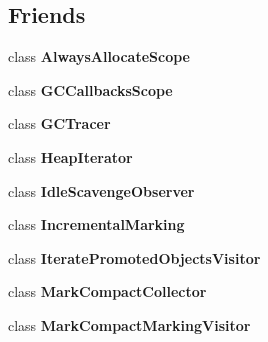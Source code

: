 \subsection*{Friends}
\begin{DoxyCompactItemize}
\item 
class {\bfseries Always\+Allocate\+Scope}\hypertarget{classv8_1_1internal_1_1_heap_ac91b5d86c9421c14c5d1ac542e048fa7}{}\label{classv8_1_1internal_1_1_heap_ac91b5d86c9421c14c5d1ac542e048fa7}

\item 
class {\bfseries G\+C\+Callbacks\+Scope}\hypertarget{classv8_1_1internal_1_1_heap_aa5dafc4b49819817c1ab40d34e4038a2}{}\label{classv8_1_1internal_1_1_heap_aa5dafc4b49819817c1ab40d34e4038a2}

\item 
class {\bfseries G\+C\+Tracer}\hypertarget{classv8_1_1internal_1_1_heap_af0a250e40f134d7b35c7c22304f35304}{}\label{classv8_1_1internal_1_1_heap_af0a250e40f134d7b35c7c22304f35304}

\item 
class {\bfseries Heap\+Iterator}\hypertarget{classv8_1_1internal_1_1_heap_a17740079af4633df7d13bb9d3732f54d}{}\label{classv8_1_1internal_1_1_heap_a17740079af4633df7d13bb9d3732f54d}

\item 
class {\bfseries Idle\+Scavenge\+Observer}\hypertarget{classv8_1_1internal_1_1_heap_aa626bcfe03232786e2304e040bb59cc6}{}\label{classv8_1_1internal_1_1_heap_aa626bcfe03232786e2304e040bb59cc6}

\item 
class {\bfseries Incremental\+Marking}\hypertarget{classv8_1_1internal_1_1_heap_abe19bf8497a23b6101b9916f8ac1d587}{}\label{classv8_1_1internal_1_1_heap_abe19bf8497a23b6101b9916f8ac1d587}

\item 
class {\bfseries Iterate\+Promoted\+Objects\+Visitor}\hypertarget{classv8_1_1internal_1_1_heap_ab4388d3f8fbea2b3f251151414cda577}{}\label{classv8_1_1internal_1_1_heap_ab4388d3f8fbea2b3f251151414cda577}

\item 
class {\bfseries Mark\+Compact\+Collector}\hypertarget{classv8_1_1internal_1_1_heap_ae585a96455613b2bc2ae3ea75a061d8b}{}\label{classv8_1_1internal_1_1_heap_ae585a96455613b2bc2ae3ea75a061d8b}

\item 
class {\bfseries Mark\+Compact\+Marking\+Visitor}\hypertarget{classv8_1_1internal_1_1_heap_a0bf80e909f69f79c58c0ad2229c997c8}{}\label{classv8_1_1internal_1_1_heap_a0bf80e909f69f79c58c0ad2229c997c8}


\end{DoxyCompactItemize}
